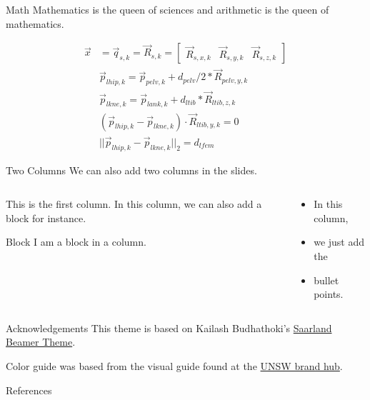 \documentclass[aspectratio=169]{beamer}
\begin{document}
	
	\begin{frame}{Math}
		Mathematics is the queen of sciences and arithmetic is the queen of mathematics.

		\begin{align*}
			\vec{x} &= \vec{q}_{s, k} = \vec{R}_{s, k} = 
			\begin{bmatrix}
			\vec{R}_{s, x, k} & \vec{R}_{s, y, k} & \vec{R}_{s, z, k}
			\end{bmatrix} \\
			& \vec{p}_{lhip, k} = \vec{p}_{pelv, k} + d_{pelv}/2*\vec{R}_{pelv, y, k} \\
			& \vec{p}_{lkne, k} = \vec{p}_{lank, k} + d_{ltib}*\vec{R}_{ltib, z, k} \\
			& (\vec{p}_{lhip, k} - \vec{p}_{lkne, k} ) \cdot \vec{R}_{ltib, y, k} = 0\\
			& ||\vec{p}_{lhip, k} - \vec{p}_{lkne, k}||_2 = d_{lfem}
		\end{align*}	
		
		
	\end{frame}

	\begin{frame}{Two Columns}
		We can also add two columns in the slides.
		\begin{columns}[t]
			\begin{column}[T]{0.4\textwidth}
				This is the first column. In this column, we can also add a block for instance.
				\vspace{1em}
				\begin{block}{Block}
					I am a block in a column.
				\end{block}
			\end{column}
			\begin{column}[T]{0.4\textwidth}
				\begin{itemize}
					\item In this column,
					\item we just add the
					\item bullet points.
				\end{itemize}
			\end{column}
		\end{columns}
	\end{frame}
	\begin{frame}{Acknowledgements}
		This theme is based on Kailash Budhathoki's \href{https://github.com/kailashbuki/beamerthemesaarland}{Saarland Beamer Theme}.
		
		Color guide was based from the visual guide found at the \href{https://www.brand.unsw.edu.au/download/}{UNSW brand hub}.
	\end{frame}

  \begin{frame}[allowframebreaks]{References}
    
    \nocite{*}
    
  \end{frame}
\end{document}
